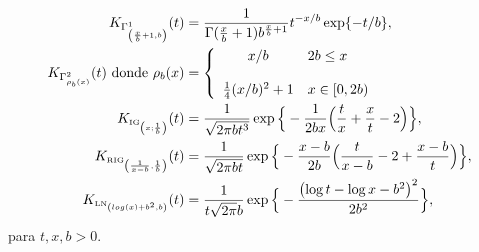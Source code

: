 
\begin{align}
K_{\tiny \Gamma^1_{\left(\frac{x}{b}+1,b\right)}}(t) & =\frac{1}{\Gamma(\frac{x}{b}+1)b^{\frac{x}{b}+1}} t^{-{x}/{b}} \exp\{-{t}/{b}\},
\label{gammakernel}\\
K_{\tiny \Gamma^2_{{\rho}_b(x)}}(t) \text{ donde }
\rho_b (x)&= \left\{
\begin{array}{c l}
x/b & 2 b \leq  x \\
\\
\frac{1}{4}(x/b)^2+1 & x \in [0,2 b)\\
\end{array}
\right.
\label{gammakernel2}\\
K_{\text{\tiny IG}_{\left( x;\frac{1}{b}\right)}}(t) & =\frac{1}{\sqrt{2\pi b t^3}} 
\exp\Big\{-\frac{1}{2b x} \Big(\frac{t}{x}+\frac{x}{t}-2\Big)\Big\},
\label{IGkernel}\\
K_{\text{\tiny RIG}_{\left(\frac{1}{x-b},\frac{1}{b}\right)}}(t) & =\frac{1}{\sqrt{2\pi b t}} 
\exp\Big\{-\frac{x-b}{2b} \Big(\frac{t}{x-b}-2+\frac{x-b}{t}\Big)\Big\},
\label{RIGkernel}\\
K_{{\text{\tiny LN}}_{\left(log(x)+b^2,b \right)}}(t) & =\frac{1}{t \sqrt{2 \pi} b} \exp\Big\{-\frac{\left(\log t - \log x -b^2\right)^2}{2b^2}\Big\},
\label{LNkernel}
\end{align}
para $t,x,b>0$.

